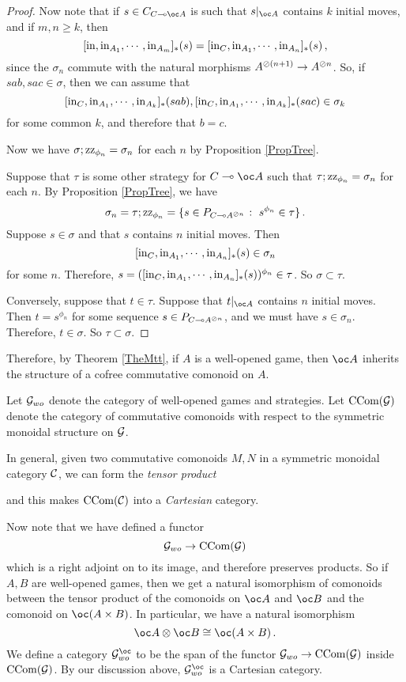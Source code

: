 \begin{proof}
  Now note that if $s\in C_{C\implies \oc A}$ is such that $s\vert_{\oc A}$ contains $k$ initial moves, and if $m,n\ge k$, then
  \[
    [\operatorname{in},\operatorname{in}_{A_1},\cdots,\operatorname{in}_{A_m}]_*(s) = [\operatorname{in}_C,\operatorname{in}_{A_1},\cdots,\operatorname{in}_{A_n}]_*(s)\,,
    \]
  since the $\sigma_n$ commute with the natural morphisms $A^{\oslash (n+1)} \to A^{\oslash n}$.  
  So, if $sab,sac\in\sigma$, then we can assume that
  \[
    [\operatorname{in}_C,\operatorname{in}_{A_1},\cdots,\operatorname{in}_{A_k}]_*(sab),[\operatorname{in}_C,\operatorname{in}_{A_1},\cdots,\operatorname{in}_{A_k}]_*(sac)\in\sigma_k
  \]
  for some common $k$, and therefore that $b=c$.

  Now we have $\sigma;\operatorname{zz}_{\phi_n}=\sigma_n$ for each $n$ by Proposition \ref{PropTree}.

  Suppose that $\tau$ is some other strategy for $C\implies \oc A$ such that $\tau;\operatorname{zz}_{\phi_n}=\sigma_n$ for each $n$.  
  By Proposition \ref{PropTree}, we have
  \[
    \sigma_n = \tau;\operatorname{zz}_{\phi_n} = \{s\in P_{C\multimap A^{\oslash n}}\;\colon\; s^{\phi_n}\in\tau\}\,.
    \]
  Suppose $s\in\sigma$ and that $s$ contains $n$ initial moves.  
  Then 
  \[
    [\operatorname{in}_C,\operatorname{in}_{A_1},\cdots,\operatorname{in}_{A_n}]_*(s)\in\sigma_n
    \]
  for some $n$.  
  Therefore, $s=([\operatorname{in}_C,\operatorname{in}_{A_1},\cdots,\operatorname{in}_{A_n}]_*(s))^{\phi_n}\in\tau$.  
  So $\sigma\subset\tau$.
  
  Conversely, suppose that $t\in\tau$.  
  Suppose that $t\vert_{\oc A}$ contains $n$ initial moves.  
  Then $t=s^{\phi_n}$ for some sequence $s\in P_{C\multimap A^{\oslash n}}$, and we must have $s\in\sigma_n$.  
  Therefore, $t\in\sigma$.  
  So $\tau\subset\sigma$.
\end{proof}

Therefore, by Theorem \ref{TheMtt}, if $A$ is a well-opened game, then $\oc A$ inherits the structure of a cofree commutative comonoid on $A$.

Let $\mathcal G_{wo}$ denote the category of well-opened games and strategies.  
Let $\operatorname{CCom}(\mathcal G)$ denote the category of commutative comonoids with respect to the symmetric monoidal structure on $\mathcal G$.

In general, given two commutative comonoids $M,N$ in a symmetric monoidal category ${\mathcal{C}}$, we can form the \emph{tensor product}
and this makes $\operatorname{CCom}({\mathcal{C}})$ into a \emph{Cartesian} category.  

Now note that we have defined a functor
\[
  \mathcal G_{wo} \to \operatorname{CCom}(\mathcal G)
  \]
which is a right adjoint on to its image, and therefore preserves products.  
So if $A,B$ are well-opened games, then we get a natural isomorphism of comonoids between the tensor product of the comonoids on $\oc A$ and $\oc B$ and the comonoid on $\oc(A\times B)$.
In particular, we have a natural isomorphism
\[
  \oc A \tensor \oc B \cong \oc (A \times B)\,.
  \]
We define a category $\G_{wo}^{\oc}$ to be the span of the functor $\mathcal G_{wo}\to \operatorname{CCom}(\mathcal G)$ inside $\operatorname{CCom}(\mathcal G)$.  
By our discussion above, $\G_{wo}^{\oc}$ is a Cartesian category.  

